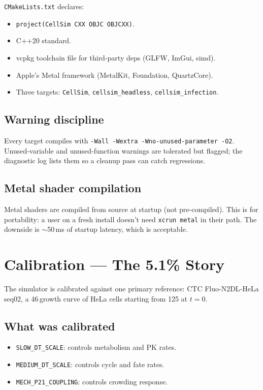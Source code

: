 \documentclass[11pt,letterpaper,twoside,openany]{book}
\newcommand{\code}[1]{\texttt{#1}}
\newcommand{\file}[1]{\texttt{\small#1}}
\newcommand{\bioh}{\text{bio-h}}
\begin{document}
\file{CMakeLists.txt} declares:
\begin{itemize}
  \item \texttt{project(CellSim CXX OBJC OBJCXX)}.
  \item C++20 standard.
  \item vcpkg toolchain file for third-party deps (GLFW, ImGui,
        simd).
  \item Apple's Metal framework (MetalKit, Foundation,
        QuartzCore).
  \item Three targets: \code{CellSim}, \code{cellsim\_headless},
        \code{cellsim\_infection}.
\end{itemize}

\section{Warning discipline}

Every target compiles with \code{-Wall -Wextra
-Wno-unused-parameter -O2}. Unused-variable and unused-function
warnings are tolerated but flagged; the diagnostic log lists them
so a cleanup pass can catch regressions.

\section{Metal shader compilation}

Metal shaders are compiled from source at startup (not
pre-compiled). This is for portability: a user on a fresh install
doesn't need \code{xcrun metal} in their path. The downside is
$\sim$50\,ms of startup latency, which is acceptable.

\chapter{Calibration --- The 5.1\% Story}
\label{ch:calibration-deep}

The simulator is calibrated against one primary reference: CTC
Fluo-N2DL-HeLa seq02, a 46\,\bioh growth curve of HeLa cells
starting from 125 at $t=0$.

\section{What was calibrated}

\begin{itemize}
  \item \code{SLOW\_DT\_SCALE}: controls metabolism and PK rates.
  \item \code{MEDIUM\_DT\_SCALE}: controls cycle and fate rates.
  \item \code{MECH\_P21\_COUPLING}: controls crowding response.
\end{itemize}
\end{document}
